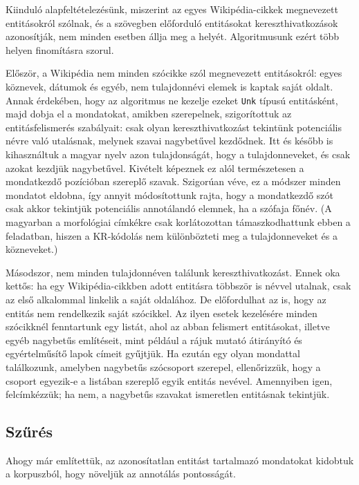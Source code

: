 \documentclass{llncs}
\begin{document}
Kiinduló alapfeltételezésünk, miszerint az egyes Wikipédia-cikkek megnevezett
entitásokról szólnak, és a szövegben előforduló entitásokat kereszthivatkozások
azonosítják, nem minden esetben állja meg a helyét. Algoritmusunk ezért
több helyen finomításra szorul.

Először, a Wikipédia nem minden szócikke szól megnevezett entitásokról:
egyes köznevek, dátumok és egyéb, nem tulajdonnévi elemek is
kaptak saját oldalt. Annak érdekében, hogy az algoritmus ne
kezelje ezeket \texttt{Unk} típusú entitásként, majd dobja el a mondatokat,
amikben szerepelnek, szigorítottuk az entitásfelismerés szabályait: csak olyan
kereszthivatkozást tekintünk potenciális névre való utalásnak, melynek szavai nagybetűvel kezdődnek.
Itt és később is kihasználtuk a magyar nyelv azon tulajdonságát, hogy a
tulajdonneveket, és csak azokat kezdjük nagybetűvel. 
Kivételt képeznek ez alól természetesen a mondatkezdő pozícióban szereplő szavak. Szigorúan véve, ez a módszer minden mondatot eldobna, így annyit módosítottunk rajta, hogy a mondatkezdő szót csak akkor tekintjük potenciális annotálandó elemnek, ha a szófaja főnév.  
(A magyarban a morfológiai címkékre csak korlátozottan támaszkodhattunk ebben a feladatban, hiszen a KR-kódolás nem különbözteti meg a tulajdonneveket és a közneveket.)

Másodszor, nem minden tulajdonnéven találunk
kereszthivatkozást. Ennek oka kettős: ha egy Wikipédia-cikkben adott entitásra
többször is névvel utalnak, csak az első alkalommal linkelik a saját oldalához. De
előfordulhat az is, hogy az entitás nem rendelkezik saját szócikkel. Az ilyen
esetek kezelésére minden szócikknél fenntartunk egy listát, ahol az abban
felismert entitásokat, illetve egyéb nagybetűs említéseit, mint például a rájuk mutató
átirányító és egyértelműsítő lapok címeit gyűjtjük. Ha ezután egy olyan mondattal
találkozunk, amelyben nagybetűs szócsoport szerepel, ellenőrizzük, hogy a csoport
egyezik-e a listában szereplő egyik entitás nevével. Amennyiben igen,
felcímkézzük; ha nem, a nagybetűs szavakat ismeretlen entitásnak tekintjük.

\subsection{Szűrés}

Ahogy már említettük, az azonosítatlan entitást tartalmazó mondatokat kidobtuk a korpuszból, hogy növeljük az annotálás pontosságát. 
\end{document}
